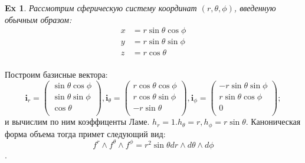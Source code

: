 \documentclass{article}
\newtheorem{example}{Ex}
\begin{document}
 	\begin{example}
 		
 		
 		Рассмотрим сферическую систему координат $(r, \theta, \phi)$, введенную обычным образом:
 		\begin{align*}
 		x & = r \sin \theta \cos \phi \\
 		y &= r \sin \theta \sin \phi \\
 		z &= r \cos \theta \\
 		\end{align*}
 	\end{example}
 	Построим базисные вектора:
 	$$ 
 	\mathbf{i}_r = \begin{pmatrix}
 	\sin \theta \cos \phi \\
 	\sin \theta \sin \phi \\
 	\cos \theta\\
 	\end{pmatrix},
 	\mathbf{i}_{\theta} =\begin{pmatrix}
 	r \cos \theta \cos \phi \\
 	r \cos \theta \sin \phi \\
 	-r \sin \theta\\
 	\end{pmatrix},
 	\mathbf{i}_{\phi} =\begin{pmatrix}
 	- r \sin \theta \sin \phi \\
 	r \sin \theta \cos \phi \\
 	0\\
 	\end{pmatrix};
 	$$
 	и вычислим по ним коэффиценты Ламе. $h_r = 1. h_\theta = r, h_\phi = r \sin \theta$.
 	Каноническая форма объема тогда примет следующий вид:
 	$$f^r \wedge f^\theta \wedge f^\phi = r^2 \sin \theta dr \wedge d \theta \wedge d \phi$$.
 	
\end{document}
